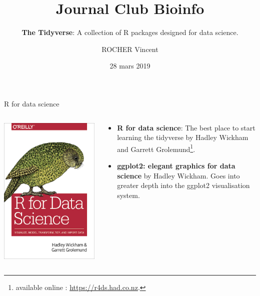 \documentclass[14pt,ignorenonframetext,]{bredelebeamer}
\title{Journal Club Bioinfo}
\subtitle{\textbf{The Tidyverse}: A collection of R packages designed for data
science.}
\author{ROCHER Vincent}
\date{28 mars 2019}
\begin{document}
\frame{\titlepage}

\begin{frame}{R for data science}
\begin{columns}
    \begin{column}{0.3\textwidth}
\includegraphics{images/cover.png}
    \end{column}
    \begin{column}{0.7\textwidth}
    \begin{Large}
    \begin{itemize}
        \item \textbf{R for data science}: The best place to start learning the tidyverse by Hadley Wickham and Garrett Grolemund\footnote{available online : \url{https://r4ds.had.co.nz}.}.
        \item \textbf{ggplot2: elegant graphics for data science} by Hadley Wickham. Goes into greater depth into the ggplot2 visualisation system.
    \end{itemize}
    \end{Large}
    \end{column}
\end{columns}
\end{frame}
\end{document}
